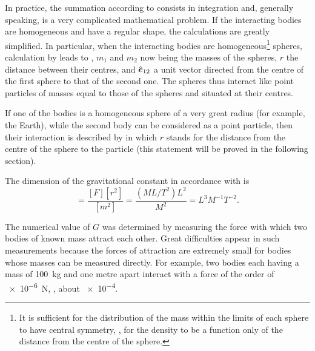 In practice, the summation according to  consists in integration and, generally speaking, is a very complicated mathematical problem. If the interacting bodies are homogeneous and have a regular shape, the calculations are greatly simplified. In particular, when the interacting bodies are homogeneous\footnote{It is sufficient for the distribution of the mass within the limits of each sphere to have central symmetry, \ie, for the density to be a function only of the	distance from the centre of the sphere.} spheres, calculation by  leads to , $m_1$ and $m_2$ now being the masses of the spheres, $r$ the distance between their centres, and $\hat{\boldsymbol{e}}_{12}$ a unit vector directed from the centre of the first sphere to that of the second one. The spheres thus interact like point particles of masses equal to those of the spheres and situated at their centres.

If one of the bodies is a homogeneous sphere of a very great radius (for example, the Earth), while the second body can be considered as a point particle, then their interaction is described by  in which $r$ stands for the distance from the centre of the sphere to the particle (this statement will be proved in the following section).

The dimension of the gravitational constant in accordance with  is
\begin{equation*}
	[G] = \frac{[F][r^2]}{[m^2]} = \frac{(ML/T^2)L^2}{M^2} = L^3M^{-1}T^{-2}.
\end{equation*}

\noindent
The numerical value of $G$ was determined by measuring the force with which two bodies of known mass attract each other. Great difficulties appear in such measurements because the forces of attraction are extremely small for bodies whose masses can be measured directly. For example, two bodies each having a mass of \SI{100}{\kilo\gram} and one metre apart interact with a force of the order of \SI{e-6}{\newton}, \ie, about \SI{e-4}{\gf}.

